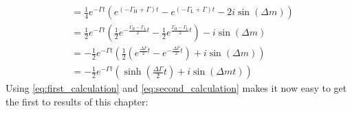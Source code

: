 \begin{align}
    &=\frac{1}{4}e^{-\Gamma t}\left(e^{\left(-\Gamma_{\text{H}}+\Gamma\right)t} - e^{\left(-\Gamma_{\text{L}}+\Gamma\right)t} - 2i\sin\left(\Delta m\right)\right)\nonumber\\
    &=\frac{1}{2}e^{-\Gamma t}\left(\frac{1}{2}e^{-\frac{\Gamma_{\text{H}}-\Gamma_{\text{L}}}{2}t} - \frac{1}{2}e^{\frac{\Gamma_{\text{H}}-\Gamma_{\text{L}}}{2}t}\right)
    -i\sin\left(\Delta m\right)\nonumber\\
    &= -\frac{1}{2}e^{-\Gamma t}\left(\frac{1}{2}\left(e^{\frac{\Delta\Gamma}{2}t} - e^{-\frac{\Delta\Gamma}{2}t}\right)
    +i\sin\left(\Delta m\right)\right)\nonumber\\
    &= -\frac{1}{2}e^{-\Gamma t}\left(\sinh\left(\frac{\Delta\Gamma}{2}t\right)+i\sin\left(\Delta m t\right)\right)\label{eq:second_calculation}
\end{align}
Using \cref{eq:first_calculation} and \cref{eq:second_calculation} makes it now easy to get the first to results of this chapter:
